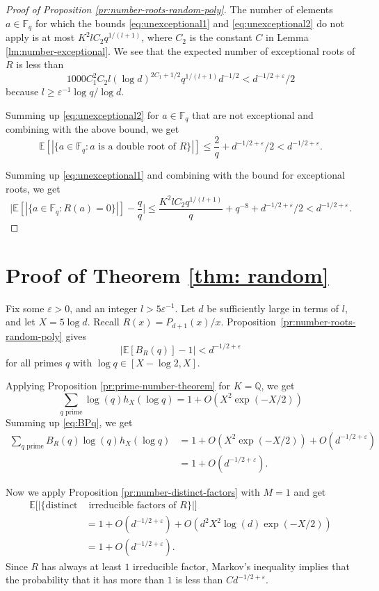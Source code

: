 \documentclass[12pt, notitlepage]{amsart}
\numberwithin{equation}{section}
\def\Q{\mathbb Q}
\def\F{\mathbb F}
\def\E{\mathbb E}
\theoremstyle{remark}
\theoremstyle{definition}
\theoremstyle{remark}
\numberwithin{equation}{section}
\newcommand{\e}{\varepsilon}
\begin{document}
\begin{proof}[Proof of Proposition \ref{pr:number-roots-random-poly}]
The number of elements $a\in\F_q$ for which the bounds \eqref{eq:unexceptional1}
and \eqref{eq:unexceptional2} do not apply is at most
$K^2lC_2q^{1/(l+1)}$, where $C_2$ is the constant
$C$ in Lemma \ref{lm:number-exceptional}.
We see that the expected number of exceptional roots of $R$ is less than
\[
1000C_1^2C_2l(\log d)^{2C_1+1/2}q^{1/(l+1)} d^{-1/2}<d^{-1/2+\e}/2
\]
because $l\ge \e^{-1}\log q/\log d$.

Summing up \eqref{eq:unexceptional2} for $a\in\F_q$ that are not exceptional
and combining with the above bound, we get
\[
\E[|\{a\in\F_q: \text{$a$ is a double root of $R$}\}|]\le \frac{2}{q}+d^{-1/2+\e}/2
< d^{-1/2+\e}.
\]

Summing up \eqref{eq:unexceptional1} and combining with the bound for exceptional
roots, we get
\[
\Big|\E[|\{a\in\F_q: R(a)=0\}|]-\frac{q}{q}\Big|
\le \frac{K^2lC_2q^{1/(l+1)}}{q}+q^{-8}+ d^{-1/2+\e}/2<d^{-1/2+\e}.
\]
\end{proof}




\section{Proof of Theorem \ref{thm: random}}
\label{sc:proof-thm}

Fix some $\e>0$, and an integer $l>5\e^{-1}$.
Let $d$ be sufficiently large in terms of $l$, and let
$X=5\log d$. Recall $R(x)=P_{d+1}(x)/x$. 
Proposition~\ref{pr:number-roots-random-poly} gives
\begin{equation}\label{eq:BPq}
|\E[B_R(q)]-1|< d^{-1/2+\e}
\end{equation}
for all primes $q$ with $\log q\in[X-\log 2,X]$.

Applying Proposition \ref{pr:prime-number-theorem} for $K=\Q$, we get
\begin{equation}\label{eq:weights}
\sum_{\text{$q$ prime}} \log (q) h_X(\log q)= 1+ O(X^2\exp(-X/2))
\end{equation}
Summing up \eqref{eq:BPq}, we get
\begin{align*}
\sum_{\text{$q$ prime}} B_R(q)\log(q) h_X(\log q)
&=1+O(X^2\exp(-X/2))+O(d^{-1/2+\e})\\
&=1+O(d^{-1/2+\e}).
\end{align*}

Now we apply Proposition \ref{pr:number-distinct-factors} with $M=1$
and get
\begin{align*}
\E[|\{\text{distinct} &\text{ irreducible factors of $R$}\}|]\\
&=1+O(d^{-1/2+\e})+ O(d^2 X^2\log(d)\exp(-X/2))\\
&=1+O(d^{-1/2+\e}).
\end{align*}
Since $R$ has always at least $1$ irreducible factor, Markov's inequality
implies that the probability that it has more than $1$ is less than
$C d^{-1/2+\e}$.
\end{document}

